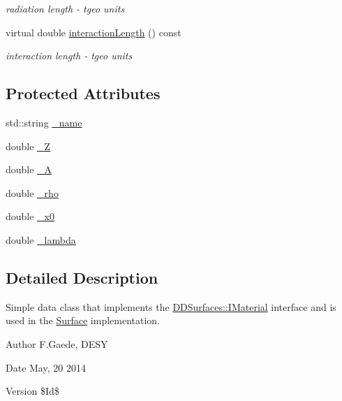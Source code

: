 \begin{DoxyCompactItemize}
\begin{DoxyCompactList}\small\item\em radiation length -\/ tgeo units \item\end{DoxyCompactList}\item 
virtual double \hyperlink{class_d_d4hep_1_1_d_d_rec_1_1_material_data_a0e3fd6b074f9ded683b5e2e66569cd0c}{interactionLength} () const 
\begin{DoxyCompactList}\small\item\em interaction length -\/ tgeo units \item\end{DoxyCompactList}\end{DoxyCompactItemize}
\subsection*{Protected Attributes}
\begin{DoxyCompactItemize}
\item 
std::string \hyperlink{class_d_d4hep_1_1_d_d_rec_1_1_material_data_aec3008cab8825e1aa3813043ebafb77a}{\_\-name}
\item 
double \hyperlink{class_d_d4hep_1_1_d_d_rec_1_1_material_data_acf48e4405aaa58e1255d41e49c0c956a}{\_\-Z}
\item 
double \hyperlink{class_d_d4hep_1_1_d_d_rec_1_1_material_data_a0f26dcc4953ef81b56673d32a3cdd66c}{\_\-A}
\item 
double \hyperlink{class_d_d4hep_1_1_d_d_rec_1_1_material_data_a9589f3b1eeba21a241b7d17e469705a1}{\_\-rho}
\item 
double \hyperlink{class_d_d4hep_1_1_d_d_rec_1_1_material_data_a187ecb221422fa7e4451cce49480cdca}{\_\-x0}
\item 
double \hyperlink{class_d_d4hep_1_1_d_d_rec_1_1_material_data_a7917025516bbbdaa104c86d6e95ddb28}{\_\-lambda}
\end{DoxyCompactItemize}


\subsection{Detailed Description}
Simple data class that implements the \hyperlink{class_d_d_surfaces_1_1_i_material}{DDSurfaces::IMaterial} interface and is used in the \hyperlink{class_d_d4hep_1_1_d_d_rec_1_1_surface}{Surface} implementation.

\begin{DoxyAuthor}{Author}
F.Gaede, DESY 
\end{DoxyAuthor}
\begin{DoxyDate}{Date}
May, 20 2014 
\end{DoxyDate}
\begin{DoxyVersion}{Version}
\$Id\$ 
\end{DoxyVersion}


